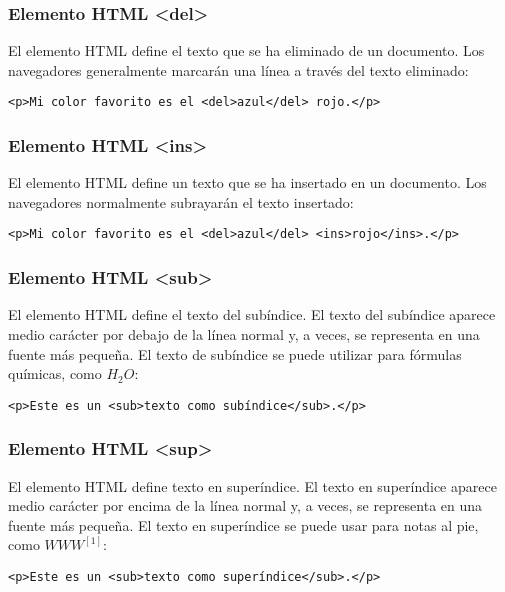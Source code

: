 \begin{frame}[fragile]
  \frametitle{Elemento HTML <del>}

  El elemento HTML  define el texto que se ha eliminado
  de un documento. Los navegadores generalmente marcarán una línea
  a través del texto eliminado:

  \vspace{\baselineskip}
  \begin{lstlisting}
<p>Mi color favorito es el <del>azul</del> rojo.</p>
  \end{lstlisting}
\end{frame}

\begin{frame}[fragile]
  \frametitle{Elemento HTML <ins>}

  El elemento HTML  define un texto que se ha insertado
  en un documento. Los navegadores normalmente subrayarán el texto
  insertado:

  \vspace{\baselineskip}
  \begin{lstlisting}
<p>Mi color favorito es el <del>azul</del> <ins>rojo</ins>.</p>
  \end{lstlisting}
\end{frame}

\begin{frame}[fragile]
  \frametitle{Elemento HTML <sub>}

  El elemento HTML  define el texto del subíndice.
  El texto del subíndice aparece medio carácter por debajo de la
  línea normal y, a veces, se representa en una fuente más pequeña.
  El texto de subíndice se puede utilizar para fórmulas químicas,
  como $H_2O$:

  \vspace{\baselineskip}
  \begin{lstlisting}
<p>Este es un <sub>texto como subíndice</sub>.</p>
  \end{lstlisting}
\end{frame}

\begin{frame}[fragile]
  \frametitle{Elemento HTML <sup>}

  El elemento HTML  define texto en superíndice.
  El texto en superíndice aparece medio carácter por encima de
  la línea normal y, a veces, se representa en una fuente más
  pequeña. El texto en superíndice se puede usar para notas al
  pie, como $WWW^{[1]}$:

  \vspace{\baselineskip}
  \begin{lstlisting}
<p>Este es un <sub>texto como superíndice</sub>.</p>
  \end{lstlisting}
\end{frame}

